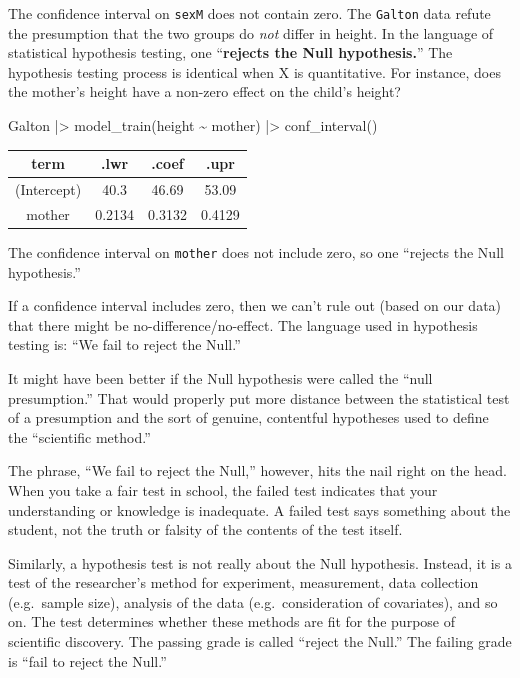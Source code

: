 \documentclass[
  letterpaper,
  DIV=11,
  numbers=noendperiod,
  oneside]{scrartcl}
\newenvironment{Shaded}{\begin{snugshade}}{\end{snugshade}}
\newcommand{\FunctionTok}[1]{\textcolor[rgb]{0.28,0.35,0.67}{#1}}
\newcommand{\NormalTok}[1]{\textcolor[rgb]{0.00,0.23,0.31}{#1}}
\newcommand{\SpecialCharTok}[1]{\textcolor[rgb]{0.37,0.37,0.37}{#1}}
\begin{document}
The confidence interval on \texttt{sexM} does not contain zero. The
\texttt{Galton} data refute the presumption that the two groups do
\emph{not} differ in height. In the language of statistical hypothesis
testing, one ``\textbf{rejects the Null hypothesis.}'' The hypothesis
testing process is identical when X is quantitative. For instance, does
the mother's height have a non-zero effect on the child's height?

\begin{Shaded}
\begin{Highlighting}[]
\NormalTok{Galton }\SpecialCharTok{|\textgreater{}} 
  \FunctionTok{model\_train}\NormalTok{(height }\SpecialCharTok{\textasciitilde{}}\NormalTok{ mother) }\SpecialCharTok{|\textgreater{}}
  \FunctionTok{conf\_interval}\NormalTok{()}
\end{Highlighting}
\end{Shaded}

\begin{longtable}[]{@{}cccc@{}}
\toprule\noalign{}
term & .lwr & .coef & .upr \\
\midrule\noalign{}
\endhead
\bottomrule\noalign{}
\endlastfoot
(Intercept) & 40.3 & 46.69 & 53.09 \\
mother & 0.2134 & 0.3132 & 0.4129 \\
\end{longtable}

The confidence interval on \texttt{mother} does not include zero, so one
``rejects the Null hypothesis.''

If a confidence interval includes zero, then we can't rule out (based on
our data) that there might be no-difference/no-effect. The language used
in hypothesis testing is: ``We fail to reject the Null.''

It might have been better if the Null hypothesis were called the ``null
presumption.'' That would properly put more distance between the
statistical test of a presumption and the sort of genuine, contentful
hypotheses used to define the ``scientific method.''

The phrase, ``We fail to reject the Null,'' however, hits the nail right
on the head. When you take a fair test in school, the failed test
indicates that your understanding or knowledge is inadequate. A failed
test says something about the student, not the truth or falsity of the
contents of the test itself.

Similarly, a hypothesis test is not really about the Null hypothesis.
Instead, it is a test of the researcher's method for experiment,
measurement, data collection (e.g.~sample size), analysis of the data
(e.g.~consideration of covariates), and so on. The test determines
whether these methods are fit for the purpose of scientific discovery.
The passing grade is called ``reject the Null.'' The failing grade is
``fail to reject the Null.''
\end{document}
